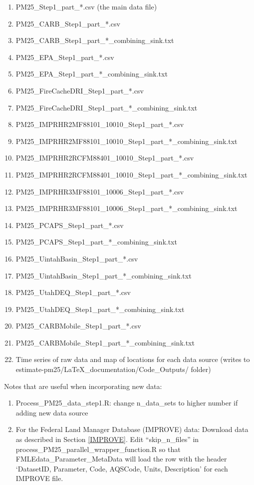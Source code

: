 \begin{enumerate}[nolistsep]
\begin{enumerate}[nolistsep]
\item PM25\_Step1\_part\_*.csv (the main data file)
\item PM25\_CARB\_Step1\_part\_*.csv
\item PM25\_CARB\_Step1\_part\_*\_combining\_sink.txt
\item PM25\_EPA\_Step1\_part\_*.csv
\item PM25\_EPA\_Step1\_part\_*\_combining\_sink.txt
\item PM25\_FireCacheDRI\_Step1\_part\_*.csv
\item PM25\_FireCacheDRI\_Step1\_part\_*\_combining\_sink.txt
\item PM25\_IMPRHR2MF88101\_10010\_Step1\_part\_*.csv
\item PM25\_IMPRHR2MF88101\_10010\_Step1\_part\_*\_combining\_sink.txt
\item PM25\_IMPRHR2RCFM88401\_10010\_Step1\_part\_*.csv
\item PM25\_IMPRHR2RCFM88401\_10010\_Step1\_part\_*\_combining\_sink.txt
\item PM25\_IMPRHR3MF88101\_10006\_Step1\_part\_*.csv
\item PM25\_IMPRHR3MF88101\_10006\_Step1\_part\_*\_combining\_sink.txt
\item PM25\_PCAPS\_Step1\_part\_*.csv
\item PM25\_PCAPS\_Step1\_part\_*\_combining\_sink.txt
\item PM25\_UintahBasin\_Step1\_part\_*.csv
\item PM25\_UintahBasin\_Step1\_part\_*\_combining\_sink.txt
\item PM25\_UtahDEQ\_Step1\_part\_*.csv
\item PM25\_UtahDEQ\_Step1\_part\_*\_combining\_sink.txt
\item PM25\_CARBMobile\_Step1\_part\_*.csv
\item PM25\_CARBMobile\_Step1\_part\_*\_combining\_sink.txt
\item Time series of raw data and map of locations for each data source (writes to estimate-pm25/LaTeX\_documentation/Code\_Outputs/ folder)
\end{enumerate}
\medskip
Notes that are useful when incorporating new data:
\begin{enumerate}
\item Process\_PM25\_data\_step1.R: change n\_data\_sets to higher number if adding new data source
\item For the Federal Land Manager Database (IMPROVE) data: Download data as described in Section \ref{IMPROVE}. Edit ``skip\_n\_files'' in process\_PM25\_parallel\_wrapper\_function.R so that FMLEdata\_Parameter\_MetaData will load the row with the header `DatasetID, Parameter, Code, AQSCode, Units, Description' for each IMPROVE file.
\end{enumerate}


\end{enumerate}
